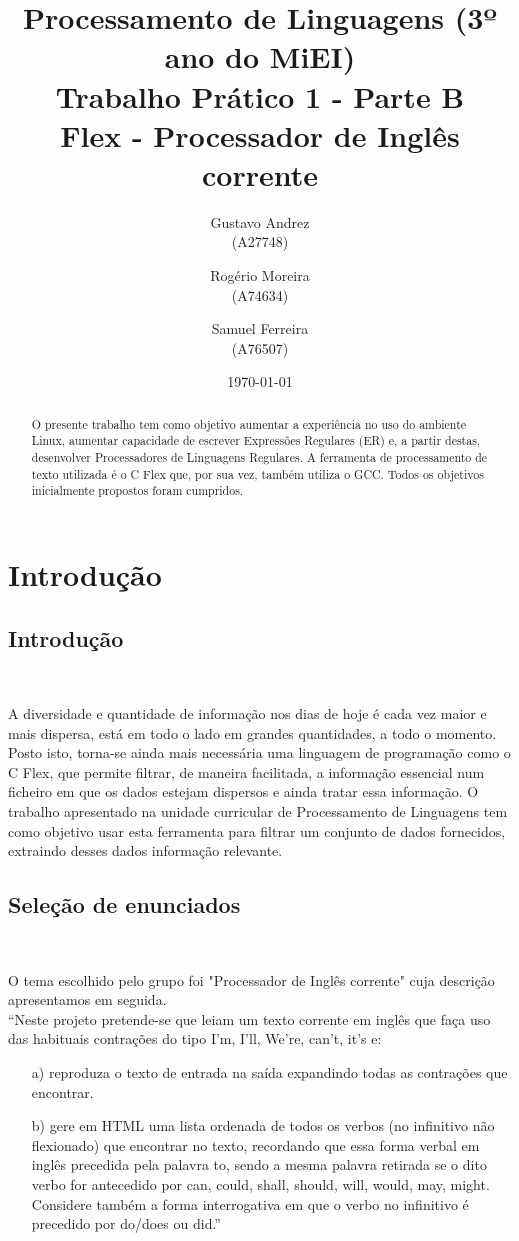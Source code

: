 \documentclass{report}
\title{Processamento de Linguagens (3º ano do MiEI)\\ \textbf{Trabalho Prático 1 - Parte B}\\ Flex - Processador de Inglês corrente}
\author{Gustavo Andrez\\ (A27748) \and Rogério Moreira\\ (A74634) \and Samuel Ferreira\\ (A76507) }
\date{\today}
\begin{document}
\maketitle

\begin{abstract}

O presente trabalho tem como objetivo aumentar a experiência no uso do ambiente Linux, aumentar capacidade de escrever Expressões Regulares (ER) e, a partir destas,  desenvolver Processadores de Linguagens Regulares.
A ferramenta de processamento de texto utilizada é o C Flex que, por sua vez, também utiliza o GCC. Todos os objetivos inicialmente propostos foram cumpridos.

\end{abstract}

\tableofcontents

\chapter{Introdu\c{c}\~ao} \label{intro}

\section*{Introdu\c{c}\~ao} \

A diversidade e quantidade de informação nos dias de hoje é cada vez maior e mais dispersa, está em todo o lado em grandes quantidades, a todo o momento. Posto isto, torna-se ainda mais necessária uma linguagem de programação como o C Flex, que permite filtrar, de maneira facilitada, a informação essencial num ficheiro em que os dados estejam dispersos e ainda tratar essa informação. O trabalho apresentado na unidade curricular de Processamento de Linguagens tem como objetivo usar esta ferramenta para filtrar um conjunto de dados fornecidos, extraindo desses dados informação relevante.

\section*{Sele\c{c}\~ao de enunciados} \

O tema escolhido pelo grupo foi "Processador de Inglês corrente" cuja descrição apresentamos em seguida.
\\“Neste projeto pretende-se que leiam um texto corrente em inglês que faça uso das habituais contrações do tipo I'm, I'll, We're, can't, it's e:
\begin{itemize}
\item[a)] reproduza o texto de entrada na saída expandindo todas as contrações que encontrar.
\item[b)] gere em HTML uma lista ordenada de todos os verbos (no infinitivo não flexionado) que encontrar no texto, recordando que essa forma verbal em inglês precedida pela palavra to, sendo a mesma palavra retirada se o dito verbo for antecedido por can, could, shall, should, will, would, may, might. Considere também a forma interrogativa em que o verbo no infinitivo é precedido por do/does ou did.”
\end{itemize}
\end{document}

